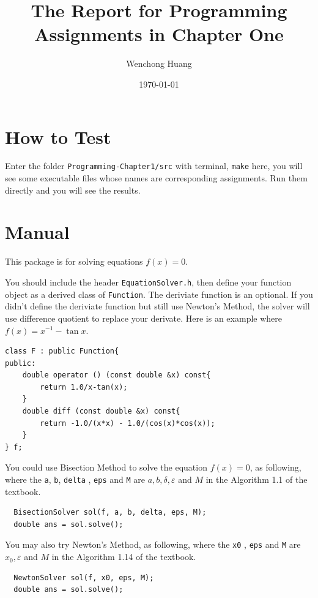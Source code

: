 \documentclass[11pt,en]{elegantpaper}
\title{The Report for Programming Assignments in Chapter One}
\author{Wenchong Huang}
\date{\today}
\begin{document}
\maketitle


\section{How to Test}

Enter the folder \verb|Programming-Chapter1/src| with terminal, \verb |make| here, you will see some executable files whose names are corresponding assignments. Run them directly and you will see the results.

\section{Manual}

This package is for solving equations $f(x)=0$.

You should include the header \verb|EquationSolver.h|, then define your function object as a derived class of \verb|Function|. The deriviate function is an optional. If you didn't define the deriviate function but still use Newton's Method, the solver will use difference quotient to replace your derivate. Here is an example where $f(x)=x^{-1}-\tan x$.

\begin{lstlisting}
class F : public Function{
public:
    double operator () (const double &x) const{
        return 1.0/x-tan(x);
    }
    double diff (const double &x) const{
        return -1.0/(x*x) - 1.0/(cos(x)*cos(x));
    }
} f;
\end{lstlisting}

You could use Bisection Method to solve the equation $f(x)=0$, as following, where the \verb|a|, \verb|b|, \verb|delta| , \verb|eps| and \verb|M| are $a,b,\delta,\varepsilon$ and $M$ in the Algorithm 1.1 of the textbook.

\begin{lstlisting}
  BisectionSolver sol(f, a, b, delta, eps, M);
  double ans = sol.solve();
\end{lstlisting}

You may also try Newton's Method, as following, where the \verb|x0| , \verb|eps| and \verb|M| are $x_0,\varepsilon$ and $M$ in the Algorithm 1.14 of the textbook.

\begin{lstlisting}
  NewtonSolver sol(f, x0, eps, M);
  double ans = sol.solve();
\end{lstlisting}
\end{document}
